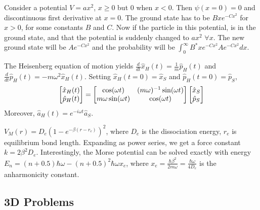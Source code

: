 \documentclass[a4paper]{article}
\begin{document}
\begin{eg}
Consider a potential $V=ax^2$, $x\geq 0$ but 0 when $x<0$. Then $\psi(x=0)=0$ and discontinuous first derivative at $x=0$. The ground state has to be $Bxe^{-Cx^2}$ for $x>0$, for some constants $B$ and $C$. Now if the particle in this potential, is in the ground state, and that the potential is suddenly changed to $ax^2$ $\forall x$. The new ground state will be $Ae^{-Cx^2}$ and the probability will be $\int_0^\infty B^*xe^{-Cx^2}Ae^{-Cx^2}dx$. 
\end{eg}
\begin{eg}
The Heisenberg equation of motion yields $\frac{d}{dt}\hat{x}_H(t)=\frac{1}{m}\hat{p}_H(t)$ and $\frac{d}{dt}\hat{p}_H(t)=-m\omega^2\hat{x}_H(t)$. Setting $\hat{x}_H(t=0)=\hat{x}_S$ and $\hat{p}_H(t=0)=\hat{p}_S$,
$$\begin{bmatrix}\hat{x}_H(t)\\\hat{p}_H(t)\\\end{bmatrix}=\begin{bmatrix}\cos(\omega t)&(m\omega)^{-1}\sin(\omega t)\\\-m\omega\sin(\omega t)&\cos(\omega t)\\\end{bmatrix}\begin{bmatrix}\hat{x}_S\\\hat{p}_S\\\end{bmatrix}$$
Moreover, $\hat{a}_H(t)=e^{-i\omega t}\hat{a}_S$. 
\end{eg}
\begin{Note}
$V_M(r)=D_e(1-e^{-\beta(r-r_e)})^2$, where $D_e$ is the dissociation energy, $r_e$ is equilibrium bond length. Expanding as power series, we get a force constant $k=2\beta^2D_e$. Interestingly, the Morse potential can be solved exactly with energy $E_n=(n+0.5)\hbar\omega-(n+0.5)^2\hbar\omega x_e$, where $x_e=\frac{\hbar\beta^2}{2m\omega}=\frac{\hbar\omega}{4D_e}$ is the anharmonicity constant.
\end{Note}
\newpage
\subsection{3D Problems}
\end{document}
